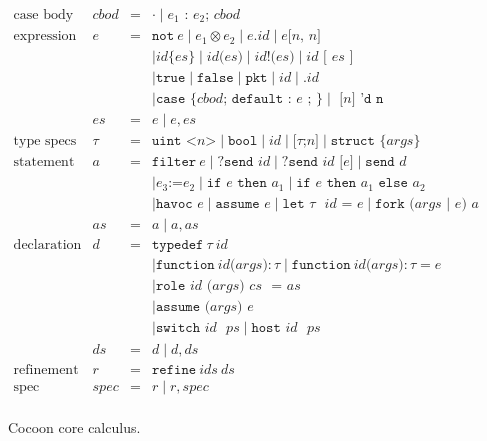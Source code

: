 \documentclass{report}
\begin{document}
\begin{figure}
\[\begin{array}{lrcl}
\textrm{case body} & cbod & = & \cdot \mid \textrm{$e_1$ : $e_2$; } cbod \\
\textrm{expression} & e & = & \texttt{not}~e \mid e_1 \otimes e_2 \mid e \texttt{.} id \mid e \texttt{[$n$, $n$]} \\
              &   &   &  \mid \texttt{$id$\{$es$\}} \mid \texttt{$id$($es$)} \mid \texttt{$id$!($es$)} \mid \texttt{$id$ [ $es$ ]} \\
              &   &   &  \mid \texttt{true} \mid \texttt{false} \mid \texttt{pkt} \mid id \mid \texttt{.$id$} \\
              &   &   &  \mid \texttt{case \{$cbod$; default : $e$ ; \}} \mid \texttt{ [$n$]~'d~n } \\
              & es & = & e \mid e, es \\
\textrm{type specs} & \tau & = & \texttt{uint <} n \texttt{>}
                                 \mid \texttt{bool}
                                 \mid id
                                 \mid \texttt{[} \tau \texttt{;} n \texttt{]}
                                 \mid \texttt{struct \{} \textit{args} \texttt{\}} \\
\textrm{statement} & a & = & \texttt{filter}~e \mid \texttt{?send $id$} \mid \texttt{?send $id$ [$e$]} \mid \texttt{send $d$} \\
                   &   &   & \mid e_3 \texttt{:=} e_2 \mid \texttt{if $e$ then $a_1$} \mid \texttt{if $e$ then $a_1$ else $a_2$} \\
                   &   &   & \mid \texttt{havoc $e$} \mid \texttt{assume $e$} \mid \texttt{let $\tau$ $id$ = $e$} \mid \texttt{fork ($args$ | $e$) $a$} \\
                   & as & = & a \mid a, as \\
\textrm{declaration} & d & = & \texttt{typedef}~\tau~id \\
                     &   &   & \mid \texttt{function}~id \texttt{(} args \texttt{)} : \tau \mid \texttt{function}~id \texttt{(} args \texttt{)} : \tau = e \\
                     &   &   & \mid \texttt{role~$id$ ($args$)~$cs$~ = $as$} \\
                     &   &   & \mid \texttt{assume ($args$) $e$} \\
                     &   &   & \mid \texttt{switch $id$ $ps$} \mid \texttt{host $id$ $ps$} \\
                     & ds & = & d \mid d, ds \\
\textrm{refinement} & r & = & \texttt{refine}~ids~ds \\
\textrm{spec} & spec & = & r \mid r, spec \\

\end{array} \]
\caption{Cocoon core calculus.}
\label{fig:core_calc}
\end{figure}
\end{document}
